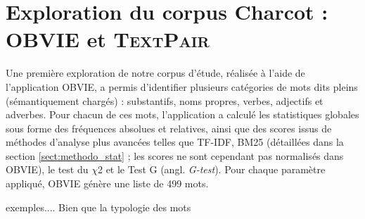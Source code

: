 \section{Exploration du corpus Charcot : \textsc{OBVIE} et \textsc{TextPair}}
\label{sect:obvie_textpair}
Une première exploration de notre corpus d'étude, réalisée à l'aide de l'application \textsc{OBVIE}, a permis d'identifier plusieurs catégories de mots dits \og{}pleins\fg{} (sémantiquement chargés) : substantifs, noms propres, verbes, adjectifs et adverbes. Pour chacun de ces mots, l'application a calculé les statistiques globales sous forme des fréquences absolues et relatives, ainsi que des scores issus de méthodes d'analyse plus avancées telles que \textsc{TF-IDF}, \textsc{BM25} (détaillées dans la section \ref{sect:methodo_stat} ; les scores ne sont cependant pas normalisés dans \textsc{OBVIE}), le test du \textsc{$\chi$2} et le Test \textsc{G} (angl. \textit{G-test}). Pour chaque paramètre appliqué, \textsc{OBVIE} génère une liste de 499 mots. 


exemples....
Bien que la typologie des mots 

